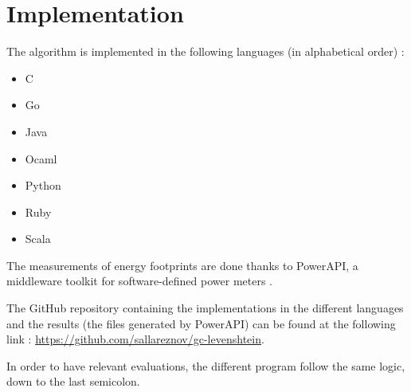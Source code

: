 \section{Implementation}
\label{sec:Implementation}
The algorithm is implemented in the following languages (in alphabetical order) :
\begin{multicols}{2}
	\begin{itemize}
		\item C
		\item Go
		\item Java
		\item Ocaml
		\item Python
		\item Ruby
		\item Scala
	\end{itemize}
\end{multicols}

The measurements of energy footprints are done thanks to PowerAPI, a middleware toolkit for software-defined power meters \cite{powerapi-website}.

The GitHub repository containing the implementations in the different languages and the results (the files generated by PowerAPI) can be found at the following link : \url{https://github.com/sallareznov/gc-levenshtein}.

In order to have relevant evaluations, the different program follow the same logic, down to the last semicolon.
